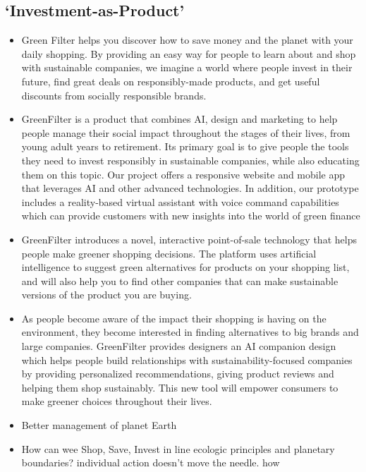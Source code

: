 \documentclass[
  letterpaper,
  DIV=11,
  numbers=noendperiod]{scrartcl}
\begin{document}
\subsection{`Investment-as-Product'}\label{investment-as-product}

\begin{itemize}
\item
  Green Filter helps you discover how to save money and the planet with
  your daily shopping. By providing an easy way for people to learn
  about and shop with sustainable companies, we imagine a world where
  people invest in their future, find great deals on responsibly-made
  products, and get useful discounts from socially responsible brands.
\item
  GreenFilter is a product that combines AI, design and marketing to
  help people manage their social impact throughout the stages of their
  lives, from young adult years to retirement. Its primary goal is to
  give people the tools they need to invest responsibly in sustainable
  companies, while also educating them on this topic. Our project offers
  a responsive website and mobile app that leverages AI and other
  advanced technologies. In addition, our prototype includes a
  reality-based virtual assistant with voice command capabilities which
  can provide customers with new insights into the world of green
  finance
\item
  GreenFilter introduces a novel, interactive point-of-sale technology
  that helps people make greener shopping decisions. The platform uses
  artificial intelligence to suggest green alternatives for products on
  your shopping list, and will also help you to find other companies
  that can make sustainable versions of the product you are buying.
\item
  As people become aware of the impact their shopping is having on the
  environment, they become interested in finding alternatives to big
  brands and large companies. GreenFilter provides designers an AI
  companion design which helps people build relationships with
  sustainability-focused companies by providing personalized
  recommendations, giving product reviews and helping them shop
  sustainably. This new tool will empower consumers to make greener
  choices throughout their lives.
\item
  Better management of planet Earth
\item
  How can wee Shop, Save, Invest in line ecologic principles and
  planetary boundaries? individual action doesn't move the needle. how

\end{itemize}
\end{document}
